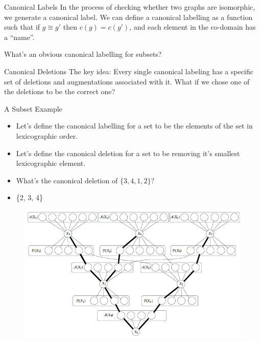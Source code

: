 \documentclass[aspectratio=169]{beamer}
\begin{document}
\begin{frame}{Canonical Labels}
    In the process of checking whether two graphs are isomorphic, we generate a canonical label. We can define a canonical labelling as a function such that if $g \cong g'$ then $c(g) = c(g')$, and each element in the co-domain has a ``name''. \pause

    \hfill

    What's an obvious canonical labelling for subsets? 
\end{frame}

\begin{frame}{Canonical Deletions}
    The key idea: Every single canonical labeling has a specific set of deletions and augmentations associated with it. What if we chose one of the deletions to be the correct one? 
\end{frame}

\begin{frame}{A Subset Example}
\begin{itemize}
    \item Let's define the canonical labelling for a set to be the elements of the set in lexicographic order. \pause 
    \item Let's define the canonical deletion for a set to be removing it's smallest lexicographic element. \pause
    \item \textcolor{sigma@alertred}{What's the canonical deletion of $\{3, 4, 1, 2\}$?} \pause
    \item \textcolor{sigma@mainblue}{\{2, 3, 4\}}
\end{itemize}
\end{frame}

\begin{frame}{}
    \begin{figure}
        \centering
        \includegraphics[width = \linewidth]{canonical_deletions.png}
    \end{figure}
\end{frame}
\end{document}

